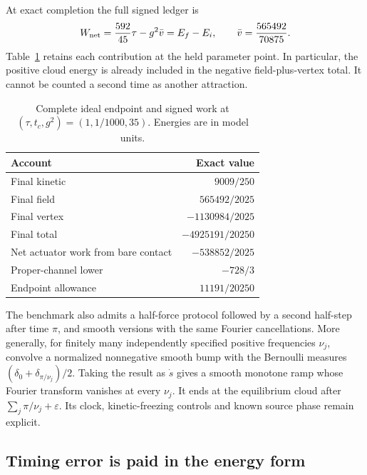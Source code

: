 At exact completion the full signed ledger is
\begin{equation}
W_{\rm net}=\frac{592}{45}\tau-g^2\bar v=E_f-E_i,
\qquad \bar v=\frac{565492}{70875}.
\end{equation}
Table~\ref{tab:loading-ledger-new} retains each contribution at the held
parameter point. In particular, the positive cloud energy is already
included in the negative field-plus-vertex total. It cannot be counted a
second time as another attraction.

\begin{table}[htbp]
\centering\small
\caption{Complete ideal endpoint and signed work at
$(\tau,t_c,g^2)=(1,1/1000,35)$. Energies are in model units.}
\begin{tabular}{lr}\toprule
Account & Exact value\\\midrule
Final kinetic & $9009/250$\\
Final field & $565492/2025$\\
Final vertex & $-1130984/2025$\\
Final total & $-4925191/20250$\\
Net actuator work from bare contact & $-538852/2025$\\
Proper-channel lower & $-728/3$\\
Endpoint allowance & $11191/20250$\\\bottomrule
\end{tabular}
\label{tab:loading-ledger-new}
\end{table}

The benchmark also admits a half-force protocol followed by a second
half-step after time $\pi$, and smooth versions with the same Fourier
cancellations. More generally, for finitely many independently specified
positive frequencies $\nu_j$, convolve a normalized nonnegative smooth
bump with the Bernoulli measures
$(\delta_0+\delta_{\pi/\nu_j})/2$. Taking the result as $\dot s$ gives a
smooth monotone ramp whose Fourier transform vanishes at every $\nu_j$.
It ends at the equilibrium cloud after
$\sum_j\pi/\nu_j+\varepsilon$. Its clock, kinetic-freezing controls and
known source phase remain explicit.

\subsection{Timing error is paid in the energy form}

